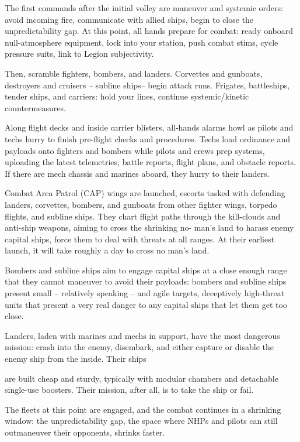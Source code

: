 The first commands after the initial volley are maneuver and systemic orders: avoid incoming fire,
communicate with allied ships, begin to close the unpredictability gap. At this point, all hands
prepare for combat: ready onboard null-atmosphere equipment, lock into your station, push
combat stims, cycle pressure suits, link to Legion subjectivity.


Then, scramble fighters, bombers, and landers. Corvettes and gunboats, destroyers and cruisers
-- subline ships-- begin attack runs. Frigates, battleships, tender ships, and carriers: hold your
lines, continue systemic/kinetic countermeasures.


Along flight decks and inside carrier blisters, all-hands alarms howl as pilots and techs hurry to
finish pre-flight checks and procedures. Techs load ordinance and payloads onto fighters and
bombers while pilots and crews prep systems, uploading the latest telemetries, battle reports,
flight plans, and obstacle reports. If there are mech chassis and marines aboard, they hurry to
their landers.


Combat Area Patrol (CAP) wings are launched, escorts tasked with defending landers, corvettes,
bombers, and gunboats from other fighter wings, torpedo flights, and subline ships. They chart
flight paths through the kill-clouds and anti-ship weapons, aiming to cross the shrinking no-
man’s land to harass enemy capital ships, force them to deal with threats at all ranges. At their
earliest launch, it will take roughly a day to cross no man’s land.


Bombers and subline ships aim to engage capital ships at a close enough range that they cannot
maneuver to avoid their payloads: bombers and subline ships present small -- relatively speaking
-- and agile targets, deceptively high-threat units that present a very real danger to any capital
ships that let them get too close.


Landers, laden with marines and mechs in support, have the most dangerous mission: crash into
the enemy, disembark, and either capture or disable the enemy ship from the inside. Their ships




are built cheap and sturdy, typically with modular chambers and detachable single-use boosters.
Their mission, after all, is to take the ship or fail.


The fleets at this point are engaged, and the combat continues in a shrinking window: the
unpredictability gap, the space where NHPs and pilots can still outmaneuver their opponents,
shrinks faster.


